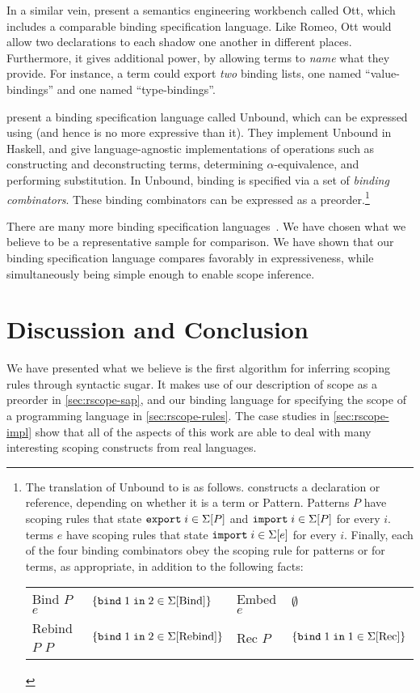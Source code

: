 In a similar vein, \cite{sewell-ott-jfp} present a semantics engineering
workbench called Ott, which includes a comparable binding
specification language. Like Romeo, Ott would allow two declarations
to each shadow one another in different places. Furthermore, it gives
additional power, by allowing terms to \emph{name} what they provide.
For instance, a term could export \emph{two} binding lists, one named
``value-bindings'' and one named ``type-bindings''.

\cite{weirich-scope} present a binding specification language called
Unbound, which can be expressed using {\sap} (and
hence is no more expressive than it).
They implement Unbound in Haskell, and give language-agnostic
implementations of operations such as constructing and deconstructing
terms, determining $\alpha$-equivalence, and performing substitution.
In Unbound, binding is specified via a set of \emph{binding combinators}.
  These binding combinators can be expressed as a preorder.\footnote{
  The translation of Unbound to {\sap} is as follows. 
  constructs a declaration or reference, depending on whether it is a
  term or Pattern. Patterns $P$ have scoping rules that state
  $\SigPExpt{i}$ and $\SigPImpt{i}$ for every $i$. terms $e$ have
  scoping rules that state $\SigImpt{e}{i}$ for every $i$. Finally,
  each of the four binding combinators obey the scoping rule for
  patterns or for terms, as appropriate, in addition to the following
  facts:
  \begin{center}
  \begin{tabular}{l l @{\quad} l l}
    Bind $P$ $e$   & $\{\SigBind{\text{Bind}}{2}{1}\}$ &
    Embed $e$      & $\emptyset$ \\
    Rebind $P$ $P$ & $\{\SigBind{\text{Rebind}}{2}{1}\}$ &
    Rec $P$        & $\{\SigBind{\text{Rec}}{1}{1}\}$
  \end{tabular}
  \end{center}
}

There are many more binding specification
languages~\cite{aczel-church-rosser,pottier-caml,nabl}.
We have chosen what we believe to be a representative sample for
comparison. We have shown that our binding specification language
compares favorably in expressiveness, while simultaneously being
simple enough to enable scope inference.

\section{Discussion and Conclusion}
We have presented what we believe is the first algorithm for
inferring scoping rules through syntactic sugar. It makes use
of our description of scope as a preorder in
\cref{sec:rscope-sap}, and our binding language for specifying the
scope of a programming language in \cref{sec:rscope-rules}. The case studies
in \cref{sec:rscope-impl} show that all of the aspects of this work
are able to deal with many interesting scoping constructs from real
languages.

